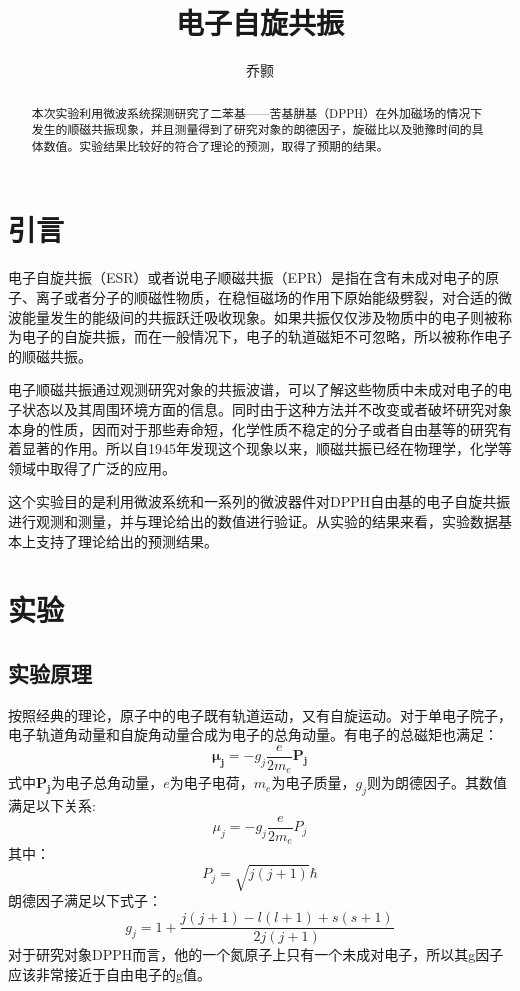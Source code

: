 \documentclass[aps,pre,12pt,preprint,onecolumn,showpacs,showkeys,UTF8]{article}
\begin{document}
\title{\bf\heiti{}电子自旋共振\vspace{15mm}}
\author{\fangsong 乔颢\vspace{2mm}}
\begin{abstract}
	\vspace{10mm}
	\begin{spacing}{1.5}
		\songti{}
		本次实验利用微波系统探测研究了二苯基——苦基肼基（DPPH）在外加磁场的情况下发生的顺磁共振现象，并且测量得到了研究对象的朗德因子，旋磁比以及驰豫时间的具体数值。实验结果比较好的符合了理论的预测，取得了预期的结果。
	\end{spacing}
\end{abstract}

\maketitle

\section{引言}
电子自旋共振（ESR）或者说电子顺磁共振（EPR）是指在含有未成对电子的原子、离子或者分子的顺磁性物质，在稳恒磁场的作用下原始能级劈裂，对合适的微波能量发生的能级间的共振跃迁吸收现象。如果共振仅仅涉及物质中的电子则被称为电子的自旋共振，而在一般情况下，电子的轨道磁矩不可忽略，所以被称作电子的顺磁共振。

电子顺磁共振通过观测研究对象的共振波谱，可以了解这些物质中未成对电子的电子状态以及其周围环境方面的信息。同时由于这种方法并不改变或者破坏研究对象本身的性质，因而对于那些寿命短，化学性质不稳定的分子或者自由基等的研究有着显著的作用。所以自1945年发现这个现象以来，顺磁共振已经在物理学，化学等领域中取得了广泛的应用\cite{Book}。

这个实验目的是利用微波系统和一系列的微波器件对DPPH自由基的电子自旋共振进行观测和测量，并与理论给出的数值进行验证。从实验的结果来看，实验数据基本上支持了理论给出的预测结果。

\section{实验}
\subsection{实验原理}
按照经典的理论，原子中的电子既有轨道运动，又有自旋运动。对于单电子院子，电子轨道角动量和自旋角动量合成为电子的总角动量。有电子的总磁矩也满足：
\begin{equation}
	\bm{\mu_j}=-g_j\frac{e}{2m_e}\bm{P_j}
\end{equation}
式中$\bm{P_j}$为电子总角动量，$e$为电子电荷，$m_e$为电子质量，$g_j$则为朗德因子。其数值满足以下关系:
\begin{equation}
	\mu_j=-g_j\frac{e}{2m_e}P_j	
\end{equation}
其中：
$$P_j=\sqrt{j(j+1)}\hbar$$
朗德因子满足以下式子：
$$g_j=1+\frac{j(j+1)-l(l+1)+s(s+1)}{2j(j+1)}$$
对于研究对象DPPH而言，他的一个氮原子上只有一个未成对电子，所以其g因子应该非常接近于自由电子的g值。
\end{document}
